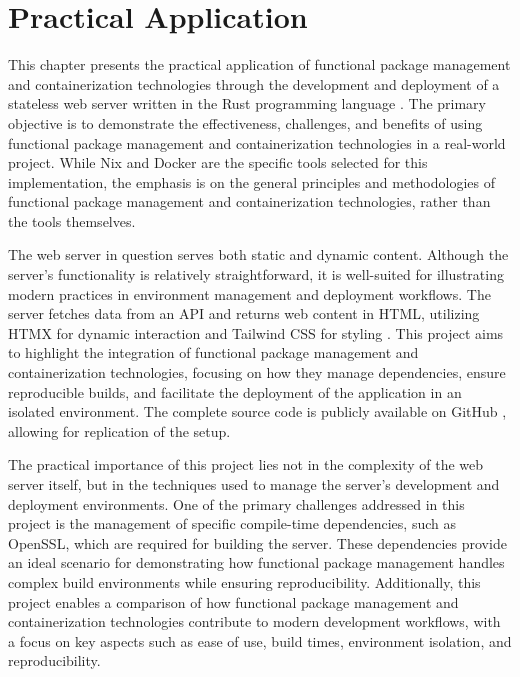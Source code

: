 \chapter{Practical Application}

This chapter presents the practical application of functional package management and
containerization technologies through the development and deployment of a stateless
web server written in the Rust programming language \cite{RustProgrammingLanguage}.
The primary objective is to demonstrate the effectiveness, challenges, and benefits
of using functional package management and containerization technologies in a real-world
project. While Nix and Docker are the specific tools selected for this implementation,
the emphasis is on the general principles and methodologies of functional package
management and containerization technologies, rather than the tools themselves.

The web server in question serves both static and dynamic content. Although the server’s
functionality is relatively straightforward, it is well-suited for illustrating modern
practices in environment management and deployment workflows. The server fetches data
from an API and returns web content in HTML, utilizing HTMX for dynamic interaction
\cite{HtmxHighPower} and Tailwind CSS for styling \cite{TailwindCSSRapidly2020}. This
project aims to highlight the integration of functional package management and
containerization technologies, focusing on how they manage dependencies, ensure
reproducible builds, and facilitate the deployment of the application in an isolated
environment. The complete source code is publicly available on GitHub
\cite{hornClemenscodesWebserver2024}, allowing for replication of the setup.

The practical importance of this project lies not in the complexity of the web server
itself, but in the techniques used to manage the server’s development and deployment
environments. One of the primary challenges addressed in this project is the management
of specific compile-time dependencies, such as OpenSSL, which are required for building
the server. These dependencies provide an ideal scenario for demonstrating how functional
package management handles complex build environments while ensuring reproducibility.
Additionally, this project enables a comparison of how functional package management
and containerization technologies contribute to modern development workflows, with a
focus on key aspects such as ease of use, build times, environment isolation, and
reproducibility.

